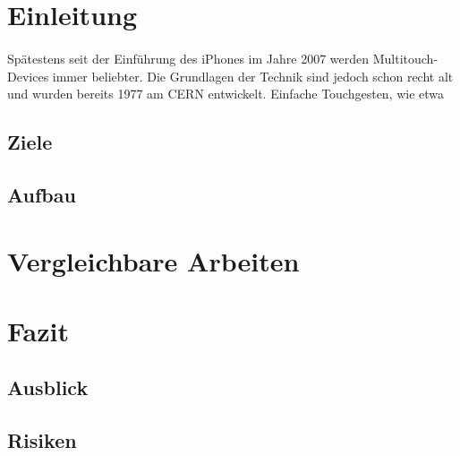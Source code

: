 \begin{abstract}

\keywords{}
\end{abstract}

\section{Einleitung}
\paragraph{}


Spätestens seit der Einführung des iPhones im Jahre 2007 %
werden Multitouch-Devices immer beliebter. Die Grundlagen der Technik sind jedoch schon recht alt und wurden bereits 1977 am CERN entwickelt\cite{Stumpe:1266588}. Einfache Touchgesten, wie etwa 

\subsection{Ziele}

\subsection{Aufbau}

\section{Vergleichbare Arbeiten}
\label{sec:vergleichbare_arbeiten}


\section{Fazit}
\label{sec:fazit}

\subsection{Ausblick}

\subsection{Risiken}